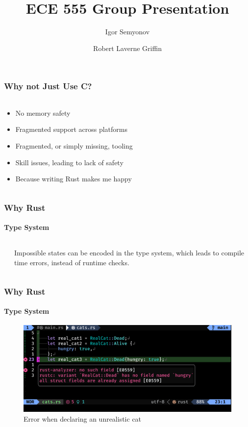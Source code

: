 \documentclass[aspectratio=169]{beamer}
\title[Short Title]{
    ECE 555 Group Presentation
}
\author{
	Igor Semyonov
	\and Robert Laverne Griffin
}
\institute{
    George Mason University, Department of Electrical and Computer Engineering
}
\begin{document}
\begin{frame}
	\vspace{-1.8cm}
	\titlepage
\end{frame}

\begin{frame}
	\frametitle{Why not Just Use C?}
	\framesubtitle{}

	\begin{columns}
		\begin{column}{0.6\textwidth}
			\begin{itemize}
				\item No memory safety
				\item Fragmented support across platforms
				\item Fragmented, or simply missing, tooling
				\item Skill issues, leading to lack of safety
				\item Because writing Rust makes me happy
			\end{itemize}
		\end{column}
	\end{columns}
\end{frame}

\begin{frame}
	\frametitle{Why Rust}
	\framesubtitle{Type System}

	\begin{columns}
		\begin{column}{0.4\textwidth}
			
		\end{column}
		\begin{column}{0.5\textwidth}
			Impossible states can be encoded in the type system, which leads to compile time errors, instead of runtime checks.
			
		\end{column}
	\end{columns}
\end{frame}

\begin{frame}
	\frametitle{Why Rust}
	\framesubtitle{Type System}
	\begin{figure}[ht]
		\centering
		\includegraphics[width=\textwidth]{./figures/real-cat.png}
		\caption{Error when declaring an unrealistic cat}
	\end{figure}
\end{frame}
\end{document}
